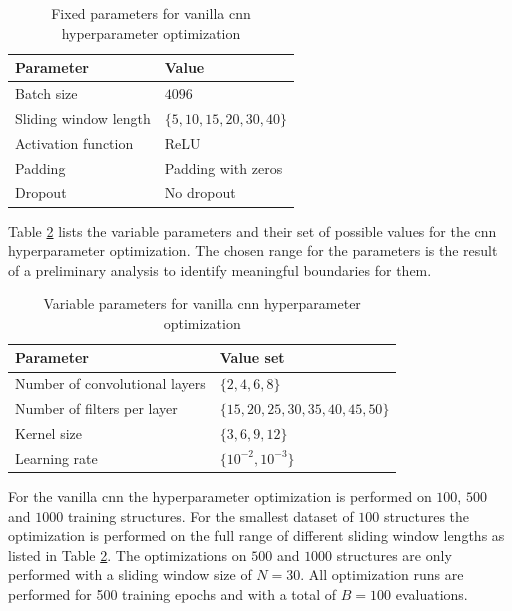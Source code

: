 \documentclass[conference]{IEEEtran}
\begin{document}
\begin{table}[htp]
	\centering
	\caption{Fixed parameters for vanilla \gls{cnn} hyperparameter optimization}
	\label{tab:fixed_parameters_cnn_optimization}
	\begin{tabular}{ll}
		\textbf{Parameter} & \textbf{Value} \\
		\hline
		Batch size & $ 4096 $ \\
		Sliding window length & $ \{5, 10, 15, 20, 30, 40\} $ \\
		Activation function & ReLU \\
		Padding & Padding with zeros \\
		Dropout & No dropout
	\end{tabular}
\end{table}

Table \ref{tab:variable_parameters_cnn_optimization} lists the variable parameters and their set of possible values for the \gls{cnn} hyperparameter optimization. The chosen range for the parameters is the result of a preliminary analysis to identify meaningful boundaries for them.

\begin{table}[htp]
	\centering
	\caption{Variable parameters for vanilla \gls{cnn} hyperparameter optimization}
	\label{tab:variable_parameters_cnn_optimization}
	\begin{tabular}{ll}
		\textbf{Parameter} & \textbf{Value set} \\
		\hline
		Number of convolutional layers & $ \{2, 4, 6, 8\} $ \\
		Number of filters per layer & $ \{15, 20, 25, 30, 35, 40, 45, 50\} $ \\
		Kernel size & $ \{3, 6, 9, 12\} $ \\
		Learning rate & $ \{10^{-2}, 10^{-3}\} $
	\end{tabular}
\end{table}

For the vanilla \gls{cnn} the hyperparameter optimization is performed on $ 100 $, $ 500 $ and $ 1000 $  training structures. For the smallest dataset of $ 100 $ structures the optimization is performed on the full range of different sliding window lengths as listed in Table \ref{tab:variable_parameters_cnn_optimization}. The optimizations on $ 500 $ and $ 1000 $ structures are only performed with a sliding window size of $ N = 30 $. All optimization runs are performed for 500 training epochs and with a total of $ B = 100 $ evaluations.
\end{document}
